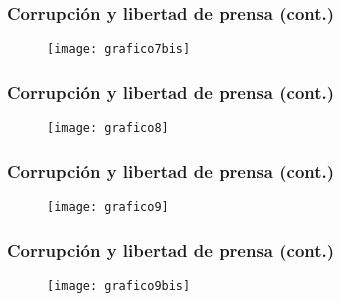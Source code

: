 \documentclass[handout,final,xcolor=dvipsnames]{beamer}
\begin{document}
\begin{frame}\frametitle{Corrupción y libertad de prensa (cont.)}
\begin{figure}[htbp]
    \centering
    \texttt{[image: grafico7bis]}
 \end{figure}
\end{frame}


\begin{frame}\frametitle{Corrupción y libertad de prensa (cont.)}
\begin{figure}[htbp]
    \centering
    \texttt{[image: grafico8]}
 \end{figure}
\end{frame}



\begin{frame}\frametitle{Corrupción y libertad de prensa (cont.)}
\begin{figure}[htbp]
    \centering
    \texttt{[image: grafico9]}
 \end{figure}
\end{frame}



\begin{frame}\frametitle{Corrupción y libertad de prensa (cont.)}
\begin{figure}[htbp]
    \centering
    \texttt{[image: grafico9bis]}
 \end{figure}
\end{frame}
\end{document}
